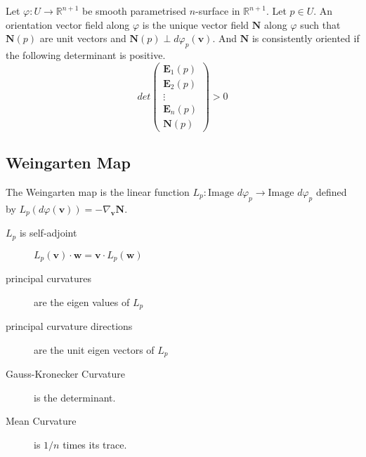 \begin{definition}
	Let $\varphi : U \to \mathbb{R}^{n+1}$ be smooth parametrised $n$-surface in $\mathbb{R}^{n+1}$. Let $p \in U$. An orientation vector field along $\varphi$ is the unique vector field $\mathbf{N}$ along $\varphi$ such that $\mathbf{N}(p)$ are unit vectors and $\mathbf{N}(p) \perp d\varphi_p(\mathbf{v})$. And $\mathbf{N}$ is consistently oriented if the following determinant is positive.
	\begin{equation}
		det\begin{pmatrix} \mathbf{E}_1(p) \\ \mathbf{E}_2(p) \\ \vdots \\ \mathbf{E}_n(p) \\ \mathbf{N}(p) \end{pmatrix} > 0
	\end{equation}
\end{definition}

\subsection{Weingarten Map}
\begin{definition}
	The Weingarten map is the linear function $L_p : \text{Image } d\varphi_p \to \text{Image }d\varphi_p$ defined by $L_p(d\varphi(\mathbf{v})) = -\nabla_\mathbf{v} \mathbf{N}$.
\end{definition}

\begin{description}
	\item[$L_p$ is self-adjoint] $L_p(\mathbf{v}) \cdot \mathbf{w} = \mathbf{v} \cdot L_p(\mathbf{w})$
	\item[principal curvatures] are the eigen values of $L_p$
	\item[principal curvature directions] are the unit eigen vectors of $L_p$
	\item[Gauss-Kronecker Curvature] is the determinant.
	\item[Mean Curvature] is $1/n$ times its trace.
\end{description}

